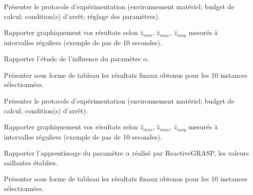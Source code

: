 \noindent
Présenter le protocole d'expérimentation (environnement matériel; budget de calcul; condition(s) d'arrêt; réglage des paramètres).

\noindent
Rapporter graphiquement vos résultats selon $\hat{z}_{min}$, $\hat{z}_{max}$, $\hat{z}_{moy}$ mesurés à intervalles réguliers (exemple de pas de 10 secondes).

\noindent
Rapporter l'étude de l'influence du paramètre $\alpha$.

\noindent
Présenter sous forme de tableau les résultats finaux obtenus pour les 10 instances sélectionnées.

%
%

\vspace{5mm}
\noindent
{}
\vspace{2mm}

\noindent
Présenter le protocole d'expérimentation (environnement matériel; budget de calcul; condition(s) d'arrêt).

\noindent
Rapporter graphiquement vos résultats selon $\hat{z}_{min}$, $\hat{z}_{max}$, $\hat{z}_{moy}$ mesurés à intervalles réguliers (exemple de pas de 10 secondes).

\noindent
Rapporter l'apprentissage du paramètre $\alpha$ réalisé par ReactiveGRASP, les valeurs saillantes établies.

\noindent
Présenter sous forme de tableau les résultats finaux obtenus pour les 10 instances sélectionnées.

%
%

\vspace{5mm}
\noindent
{}
\vspace{2mm}

